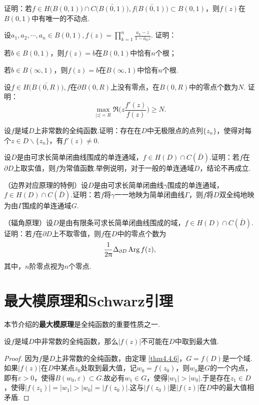 \begin{xiti}
  \item 证明：若$f\in H\big(B(0,1)\big)\cap C\big(\bar{B(0,1)}\big),
     f\big(\bar{B(0,1)}\big)\subset B(0,1)$，则$f(z)$在$B(0,1)$中有唯一的不动点.
  \item 设$a_1,a_2,\cdots,a_n\in B(0,1),f(z)=\prod_{k=1}^n\frac{a_k-z}{1-\bar a_kz}$. 证明：
    \begin{enuma}
      \item 若$b\in B(0,1)$，则$f(z)=b$在$B(0,1)$中恰有$n$个根；
      \item 若$b\in B(\infty,1)$，则$f(z)=b$在$B(\infty,1)$中恰有$n$个根.
    \end{enuma}
  \item 设$f\in H\big(\bar{B(0,R)}\big),f$在$\partial B(0,R)$上没有零点，在$B(0,R)$中的零点个数为$N$. 证明：
      \[
        \max_{|z|=R}\Re \bigg(z\frac{f'(z)}{f(z)}\bigg) \ge N.
      \]
  \item 设$f$是域$D$上非常数的全纯函数.证明：存在在$D$中无极限点的点列$\{z_n\}$，使得对每个$z\in D\backslash\{z_n\}$，有$f'(z)\ne0$.
  \item 设$D$是由可求长简单闭曲线围成的单连通域，$f\in H(D)\cap C(\bar D)$.证明：若$f$在$\partial D$上取实值，则$f$为常值函数.举例说明，对于一般的单连通域$D$，结论不再成立.
  \item \hypertarget{xiti4.4.17}{}（边界对应原理的特例）设$D$是由可求长简单闭曲线$\gamma$围成的单连通域，$f\in H(D)\cap C(\bar D)$.证明：若$f$将$\gamma$一一地映为简单闭曲线$\Gamma$，则$f$将$D$双全纯地映为由$\Gamma$围成的单连通域$G$.
  \item （辐角原理）设$D$是由有限条可求长简单闭曲线围成的域，$f\in H(D)\cap C(\bar D)$.证明：若$f$在$\partial D$上不取零值，则$f$在$D$中的零点个数为
      \[
        \frac1{2\uppi}\Delta_{\partial D}\operatorname{Arg} f(z),
      \]
     其中，$n$阶零点视为$n$个零点.
\end{xiti}

\section{最大模原理和Schwarz引理\label{sec4.5}}
本节介绍的\textbf{最大模原理}是全纯函数的重要性质之一.
\begin{theorem}\label{thm4.5.1}
  设$f$是域$D$中非常数的全纯函数，那么$|f(z)|$不可能在$D$中取到最大值.
\end{theorem}
\begin{proof}
  因为$f$是$D$上非常数的全纯函数，由定理 \ref{thm4.4.6}，$G=f(D)$是一个域.如果$|f(z)|$在$D$中某点$z_0$处取到最大值，记$w_0=f(z_0)$，则$w_0$是$G$的一个内点，即有$\varepsilon>0$，使得$B(w_0,\varepsilon)\subset G$.故必有$w_1\in G$，使得$|w_1|>|w_0|$.于是存在$z_1\in D$，使得$|f(z_1)|=|w_1|>|w_0|=|f(z_0)|$.这与$|f(z_0)|$是$|f(z)|$在$D$中的最大值相矛盾.
\end{proof}

